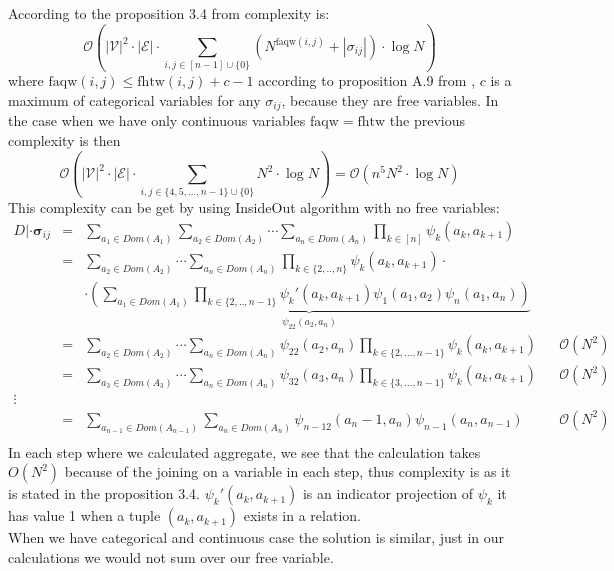 \documentclass[10pt,a4paper]{article}
\begin{document}
\begin{enumerate}
\begin{itemize}
\end{itemize}
According to the proposition 3.4 from \cite[page 7]{abo2018database}  complexity is:
$$
\mathcal{O}\left(|\mathcal{V}|^{2} \cdot|\mathcal{E}| \cdot \sum_{i, j \in[n-1]\cup\{0\}}\left(N^{\mathrm{faqw}(i, j)}+\left|\sigma_{i j}\right|\right) \cdot \log N\right)
 $$
 where $ \mathrm{faqw}(i, j) \leq \mathrm{fhtw}(i, j) + c - 1$ according to proposition A.9  from \cite{abo2018database}, $c$ is a maximum of categorical variables for any $\sigma_{ij}$, because they are free variables. In the case when we have only continuous variables $\mathrm{faqw} =\mathrm{fhtw}$ the previous complexity is then 
 $$
\mathcal{O}\left(|\mathcal{V}|^{2} \cdot|\mathcal{E}| \cdot \sum_{i, j \in \{4, 5, ..., n-1\}\cup\{0\}}N^{\mathrm{2}}\cdot \log N\right) = \mathcal{O}\left(n^5 N^{\mathrm{2}}\cdot \log N\right)
 $$
 This complexity can be get by using InsideOut algorithm with no free variables:
\begin{align*}
D| \cdot \mathbf{\sigma}_{ij}&=& 
\sum_{a_1 \in Dom(A_1)} \sum_{a_2 \in Dom(A_2)} \cdots \sum_{a_n \in Dom(A_n)} 
\prod_{k\in[n]} \psi_k(a_k, a_{k+1}) \\
&=& 
 \sum_{a_2 \in Dom(A_2)} \cdots \sum_{a_n \in Dom(A_n)} 
\prod_{k\in \{ 2, .., n\}} \psi_k(a_k, a_{k+1}) \cdot \\
&& 
\cdot 
\underbrace{\left( \sum_{a_1 \in Dom(A_1)} \prod_{k\in \{ 2, .., n-1\}}\psi_k'(a_k, a_{k+1})\psi_1(a_1, a_2) \psi_n(a_1, a_n)\right)}_{\psi_{22}(a_2, a_n)} \\
&=&  \sum_{a_2 \in Dom(A_2)} \cdots \sum_{a_n \in Dom(A_n)} 
\psi_{22}(a_2, a_n) \prod_{k\in\{2,...,n-1\} } \psi_k(a_k, a_{k+1}) &&\mathcal{O}(N^2) \\
&=&  \sum_{a_3 \in Dom(A_3)} \cdots \sum_{a_n \in Dom(A_n)} 
\psi_{32}(a_3, a_n) \prod_{k\in\{3,...,n-1\} } \psi_k(a_k, a_{k+1}) &&\mathcal{O}(N^2) \\
\vdots \\
&=&  \sum_{a_{n-1} \in Dom(A_{n-1})} \sum_{a_n \in Dom(A_n)} 
\psi_{n-1 2}(a_n-1, a_n) \psi_{n-1}(a_n, a_{n-1})&&\mathcal{O}(N^2)\\
\end{align*}
In each step where we calculated aggregate, we see that the calculation takes ${O}(N^2)$ because of the joining on a variable in each step, thus complexity is as it is stated in the proposition 3.4. $\psi_k'(a_k, a_{k+1})$ is an indicator projection of $\psi_k$ it has value 1 when a tuple $(a_k, a_{k+1})$ exists in a relation. \\
When we have categorical and continuous case the solution is similar, just in our calculations we would not sum over our free variable. 

\end{enumerate}
\end{document}
